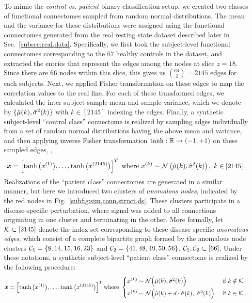 \newcommand{\muhat}{\xmath{\hat{\mu}}}
\newcommand{\mutil}{\xmath{\widetilde{\mu}}}
\newcommand{\sighat}{\xmath{\hat{\sigma}}}
\newcommand{\arctanh}{\text{arctanh}}
To mimic the \emph{control vs. patient} binary classification setup, we created two classes of functional connectomes sampled from random normal distributions. 
The mean and the variance for these distributions were assigned using the functional connectomes generated from the real resting state dataset described later in Sec.~\ref{subsec:real,data}.
Specifically, we first took the subject-level functional connectomes corresponding to the $67$ healthy controls in the dataset, and extracted the entries that represent the edges among the nodes at slice $z=18$.
Since there are $66$ nodes within this slice, this gives us $\binom{66}{2}=2145$ edges for each subjects.
Next, we applied Fisher transformation on these edges to map the correlation values to the real line.
For each of these transformed edges, we calculated the inter-subject sample mean and sample variance, which we denote by $\{\muhat(k),\sighat^2(k)\}$ with $k\in[2145]$ indexing the edges.
Finally, a synthetic subject-level ``control class'' connectome is realized by sampling edges individually from a set of random normal distributions having the above mean and variance, and then applying inverse Fisher transformation $\tanh:\mathbb{R}\to (-1,+1)$ on these sampled edges, \ie,
\[
	\x=\left[
		\tanh\big(x^{(1)}\big),
		\dots,
		\tanh\big(x^{(2145)}\big)
	\right]^T
	\text{ where } x^{(k)}\sim\calN\left(\muhat(k),\sighat^2(k)\right),\; k\in[2145].
\]
Realizations of the ``patient class'' connectomes are generated in a similar manner, but here we introduced two clusters of \emph{anomalous nodes}, indicated by the red nodes in Fig.~\ref{subfig:sim,conn,struct,ds}.
These clusters participate in a disease-specific perturbation, where signal was added to all connections originating in one cluster and terminating in the other.
More formally, let $\mathcal{K}\subset[2145]$ denote the index set corresponding to these disease-specific \emph{anomalous edges}, which consist of a complete bipartite graph formed by the anomalous node clusters $\mathcal{C}_1=\{8,14,15,16,23\}$ and $\mathcal{C}_2=\{41,48,49,50,56\}$, $\mathcal{C}_1,\mathcal{C}_2\subset[66]$.
Under these notations, a synthetic subject-level ``patient class'' connectome is realized by the following procedure:
\[
	\x=\left[
		\tanh\big(x^{(1)}\big),
		\dots,
		\tanh\big(x^{(2145)}\big)
	\right]^T 
	\text{where } 
	\begin{cases}
		x^{(k)}\sim\calN\Big(\muhat(k),\sighat^2(k)\Big) &\text{ if } k\notin\calK \vspace{3pt}\\
		x^{(k)}\sim\calN\Big(\muhat(k)+d\cdot\sighat(k),\;\sighat^2(k)\Big) &\text{ if } k\in\calK\;.
	\end{cases}
\]
